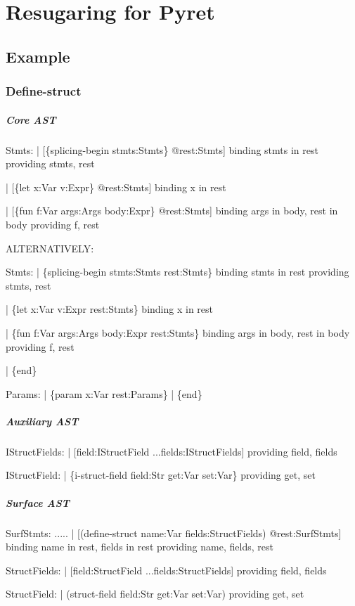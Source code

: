 \chapter{Resugaring for Pyret}

\section{Example}

\subsection{Define-struct}

\paragraph{Core AST}
\begin{Codes}
Stmts:
| [\{splicing-begin stmts:Stmts\} @rest:Stmts]
   binding stmts in rest
   providing stmts, rest

| [\{let x:Var v:Expr\} @rest:Stmts]
   binding x in rest

| [\{fun f:Var args:Args body:Expr\} @rest:Stmts]
   binding args in body, rest in body
   providing f, rest

ALTERNATIVELY:

Stmts:
| \{splicing-begin stmts:Stmts rest:Stmts\}
   binding stmts in rest
   providing stmts, rest

| \{let x:Var v:Expr rest:Stmts\}
   binding x in rest

| \{fun f:Var args:Args body:Expr rest:Stmts\}
   binding args in body, rest in body
   providing f, rest

| \{end\}

Params:
| \{param x:Var rest:Params\}
| \{end\}
\end{Codes}

\paragraph{Auxiliary AST}
\begin{Codes}
IStructFields:
| [field:IStructField ...fields:IStructFields]
  providing field, fields

IStructField:
| \{i-struct-field field:Str get:Var set:Var\}
  providing get, set
\end{Codes}

\paragraph{Surface AST}
\begin{Codes}
SurfStmts:
  .....
| [(define-struct name:Var fields:StructFields) @rest:SurfStmts]
  binding name in rest, fields in rest
  providing name, fields, rest

StructFields:
| [field:StructField ...fields:StructFields]
  providing field, fields

StructField:
| (struct-field field:Str get:Var set:Var)
  providing get, set
\end{Codes}

